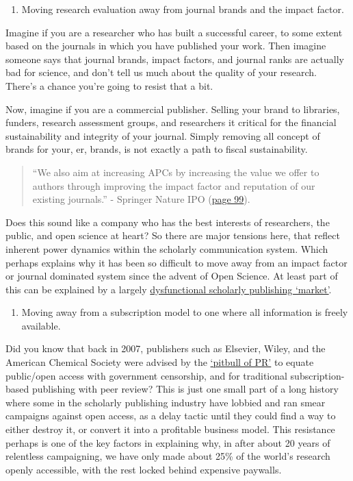 \documentclass[]{book}
\providecommand{\tightlist}{%
  \setlength{\itemsep}{0pt}\setlength{\parskip}{0pt}}
\begin{document}
{{{{\begin{enumerate}
\def\labelenumi{\arabic{enumi}.}
\tightlist
\item
  Moving research evaluation away from journal brands and the impact factor.
\end{enumerate}

Imagine if you are a researcher who has built a successful career, to some extent based on the journals in which you have published your work. Then imagine someone says that journal brands, impact factors, and journal ranks are actually bad for science, and don't tell us much about the quality of your research. There's a chance you're going to resist that a bit.

Now, imagine if you are a commercial publisher. Selling your brand to libraries, funders, research assessment groups, and researchers it critical for the financial sustainability and integrity of your journal. Simply removing all concept of brands for your, er, brands, is not exactly a path to fiscal sustainability.

\begin{quote}
``We also aim at increasing APCs by increasing the value we offer to authors through improving the impact factor and reputation of our existing journals.'' - Springer Nature IPO (\href{http://web.archive.org/web/20180507134223/http:/proxy.dbagproject.de/mediacenter/ressourcen/pdf/emissionen/springernature_prospectus.pdf}{page 99}).
\end{quote}

Does this sound like a company who has the best interests of researchers, the public, and open science at heart? So there are major tensions here, that reflect inherent power dynamics within the scholarly communication system. Which perhaps explains why it has been so difficult to move away from an impact factor or journal dominated system since the advent of Open Science. At least part of this can be explained by a largely \href{https://zenodo.org/record/1472045\#.W-7r8ZP7RPY}{dysfunctional scholarly publishing `market'}.

\begin{enumerate}
\def\labelenumi{\arabic{enumi}.}
\setcounter{enumi}{1}
\tightlist
\item
  Moving away from a subscription model to one where all information is freely available.
\end{enumerate}

Did you know that back in 2007, publishers such as Elsevier, Wiley, and the American Chemical Society were advised by the \href{https://www.nature.com/articles/445347a}{`pitbull of PR'} to equate public/open access with government censorship, and for traditional subscription-based publishing with peer review? This is just one small part of a long history where some in the scholarly publishing industry have lobbied and ran smear campaigns against open access, as a delay tactic until they could find a way to either destroy it, or convert it into a profitable business model. This resistance perhaps is one of the key factors in explaining why, in after about 20 years of relentless campaigning, we have only made about 25\% of the world's research openly accessible, with the rest locked behind expensive paywalls.

}}}}
\end{document}
